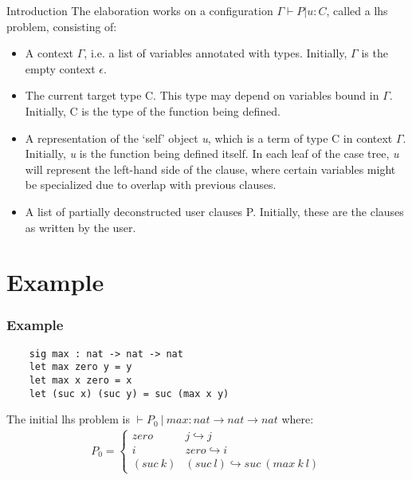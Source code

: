\documentclass[10pt, xelatex, hyperref={pdfpagelabels=false,breaklinks}]{beamer}
\begin{document}
\begin{frame}[fragile]{Introduction}
  The elaboration works on a configuration $\Gamma ⊢ P | u : C$, called a lhs problem, consisting of:
  \begin{itemize}
    \item A context $\Gamma$, i.e. a list of variables annotated with types. Initially, $\Gamma$ is the empty context $\epsilon$.
    \item The current target type C. This type may depend on variables bound in $\Gamma$. Initially, C is the type of the function being defined.
    \item A representation of the ‘self’ object \textit{u}, which is a term of type C in context $\Gamma$. Initially, \textit{u} is the function being defined itself. In each leaf of the case tree, \textit{u} will represent the left-hand side of the clause, where certain variables might be specialized due to overlap with previous clauses.
    \item A list of partially deconstructed user clauses P. Initially, these are the clauses as written by the user.
  \end{itemize}


\end{frame}

\section{Example}
\begin{frame}[fragile]
  \frametitle{Example}
  \begin{verbatim}
    sig max : nat -> nat -> nat
    let max zero y = y
    let max x zero = x
    let (suc x) (suc y) = suc (max x y)
  \end{verbatim}

  The initial lhs problem is $⊢ P_0\ |\ max: nat \to nat \to nat$ where:
  \begin{align*}
    P_0 =
      \begin{cases}
        zero & j \hookrightarrow j \\
        i & zero \hookrightarrow i \\
        (suc\ k) & (suc\ l) \hookrightarrow suc\ (max\ k\ l) 
      \end{cases}       
  \end{align*}
\end{frame}
\end{document}
